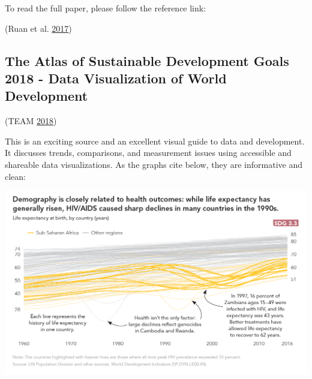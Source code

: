 \documentclass[]{book}
\begin{document}
To read the full paper, please follow the reference link:

(Ruan et al. \protect\hyperlink{ref-gapminder}{2017})

\hypertarget{the-atlas-of-sustainable-development-goals-2018---data-visualization-of-world-development}{%
\subsection{The Atlas of Sustainable Development Goals 2018 - Data Visualization of World Development}\label{the-atlas-of-sustainable-development-goals-2018---data-visualization-of-world-development}}

(TEAM \protect\hyperlink{ref-world_bank_data}{2018})

This is an exciting source and an excellent visual guide to data and development. It discusses trends, comparisons, and measurement issues using accessible and shareable data visualizations. As the graphs cite below, they are informative and clean:

\includegraphics{images/case_study_1.png}
\end{document}
